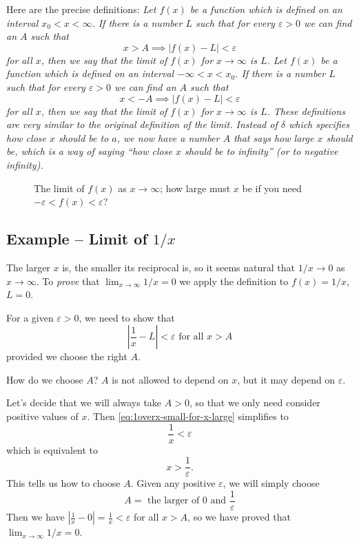Here are the precise definitions:
\itshape
Let $f(x)$ be a function which is defined on an interval $x_0<x<\infty$.
If there is a number $L$ such that for every $\varepsilon>0$ we can find
an $A$ such that
\[
x>A \implies |f(x) - L| <\varepsilon
\]
for all $x$, then we say that the limit of $f(x)$ for $x\to\infty$ is $L$.
\upshape
\itshape
Let $f(x)$ be a function which is defined on an interval $-\infty < x < x_0$.
If there is a number $L$ such that for every $\varepsilon>0$ we can find
an $A$ such that
\[
x<-A \implies |f(x) - L| <\varepsilon
\]
for all $x$, then we say that the limit of $f(x)$ for $x\to\infty$ is $L$.
\upshape
These definitions are very similar to the original definition of the limit.
Instead of $\delta$ which specifies how close $x$ should be to $a$, we now
have a number $A$ that says how large $x$ should be, which is a way of
saying ``how close $x$ should be to infinity'' (or to negative infinity).

\begin{figure}[ht]
  \centering
  

  
  \caption{The limit of $f(x)$ as $x\to\infty$; how large must $x$ be
    if you need $-\varepsilon < f(x) < \varepsilon$?}
  \label{fig:limit-of-xinv-at-infty}
\end{figure}
\subsection{Example -- Limit of $1/x$} 
\label{ex:lim1overx-at-infty-proved}
The larger $x$ is, the smaller its reciprocal is, so it seems natural that $1/x
\to 0$ as $x\to \infty$.  To \emph{prove} that $\lim_{x\to\infty}1/x = 0$ we
apply the definition to $f(x) = 1/x$, $L=0$.

For a given $\varepsilon>0$, we need to show that
\begin{equation}\label{eq:1overx-small-for-x-large}
  \left|\frac1x - L\right|<\varepsilon \text{ for all } x>A
\end{equation}
provided we choose the right $A$.

How do we choose $A$?  $A$ is not allowed to depend on $x$, but it may
depend on $\varepsilon$.

Let's decide that we will always take $A>0$, so that we only need consider
positive values of $x$.  Then \eqref{eq:1overx-small-for-x-large} simplifies to
\[
\frac 1x<\varepsilon
\]
which is equivalent to
\[
x>\frac1\varepsilon.
\]
This tells us how to choose $A$.  Given any positive $\varepsilon$, we will
simply choose
\[
  A= \text{ the larger of } 0 \text{ and } \frac1\varepsilon
\]
Then we have $|\frac1x-0| = \frac1x <\varepsilon$ for all $x>A$, so we
have proved that $\lim_{x\to\infty}1/x=0$.


